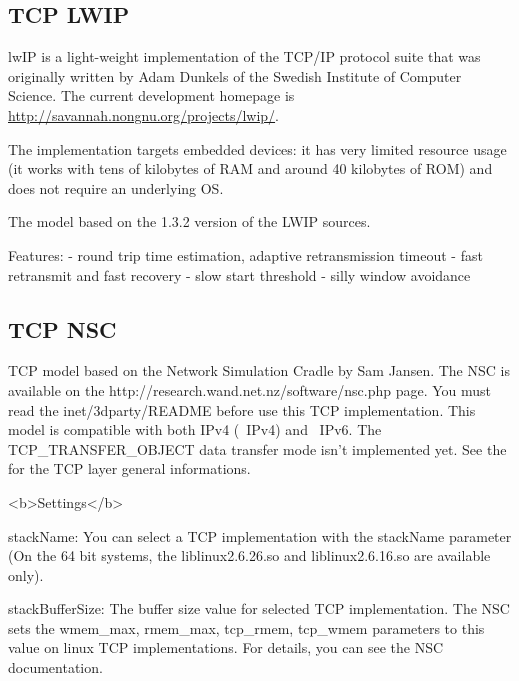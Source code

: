 \subsection{TCP LWIP}

lwIP is a light-weight implementation of the TCP/IP protocol suite
that was originally written by Adam Dunkels of the Swedish Institute of
Computer Science. The current development homepage is
\url{http://savannah.nongnu.org/projects/lwip/}.

The implementation targets embedded devices: it has
very limited resource usage (it works with tens of kilobytes of RAM and
around 40 kilobytes of ROM) and does not require an underlying OS.

The  model based on the 1.3.2 version of the LWIP sources.

Features:
- round trip time estimation, adaptive retransmission timeout
- fast retransmit and fast recovery
- slow start threshold
- silly window avoidance



\subsection{TCP NSC}

TCP model based on the Network Simulation Cradle by Sam Jansen.
The NSC is available on the http://research.wand.net.nz/software/nsc.php page.
You must read the inet/3dparty/README before use this TCP implementation.
This model is compatible with both IPv4 (~IPv4) and ~IPv6.
The TCP\_TRANSFER\_OBJECT data transfer mode isn't implemented yet.
See the  for the TCP layer general informations.

<b>Settings</b>

stackName: You can select a TCP implementation with the stackName parameter
(On the 64 bit systems, the liblinux2.6.26.so and liblinux2.6.16.so are available only).

stackBufferSize: The buffer size value for selected TCP implementation.
The NSC sets the wmem\_max, rmem\_max, tcp\_rmem, tcp\_wmem parameters to this value
on linux TCP implementations. For details, you can see the NSC documentation.




